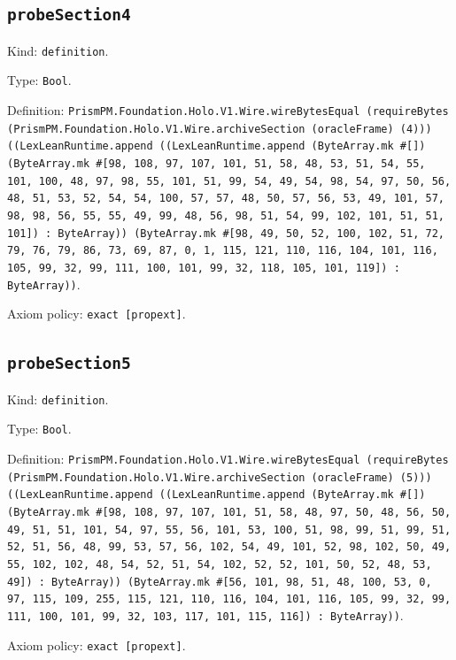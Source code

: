 \documentclass[11pt]{article}
\begin{document}
\subsection*{\texttt{probeSection4}}
\noindent Kind: \texttt{definition}.\par
\noindent Type: \texttt{Bool}.\par
\noindent Definition: \texttt{PrismPM.Foundation.Holo.V1.Wire.wireBytesEqual (requireBytes (PrismPM.Foundation.Holo.V1.Wire.archiveSection (oracleFrame) (4))) ((LexLeanRuntime.append ((LexLeanRuntime.append (ByteArray.mk \#[]) (ByteArray.mk \#[98, 108, 97, 107, 101, 51, 58, 48, 53, 51, 54, 55, 101, 100, 48, 97, 98, 55, 101, 51, 99, 54, 49, 54, 98, 54, 97, 50, 56, 48, 51, 53, 52, 54, 54, 100, 57, 57, 48, 50, 57, 56, 53, 49, 101, 57, 98, 98, 56, 55, 55, 49, 99, 48, 56, 98, 51, 54, 99, 102, 101, 51, 51, 101]) : ByteArray)) (ByteArray.mk \#[98, 49, 50, 52, 100, 102, 51, 72, 79, 76, 79, 86, 73, 69, 87, 0, 1, 115, 121, 110, 116, 104, 101, 116, 105, 99, 32, 99, 111, 100, 101, 99, 32, 118, 105, 101, 119]) : ByteArray))}.\par
\noindent Axiom policy: \texttt{exact [propext]}.\par
\subsection*{\texttt{probeSection5}}
\noindent Kind: \texttt{definition}.\par
\noindent Type: \texttt{Bool}.\par
\noindent Definition: \texttt{PrismPM.Foundation.Holo.V1.Wire.wireBytesEqual (requireBytes (PrismPM.Foundation.Holo.V1.Wire.archiveSection (oracleFrame) (5))) ((LexLeanRuntime.append ((LexLeanRuntime.append (ByteArray.mk \#[]) (ByteArray.mk \#[98, 108, 97, 107, 101, 51, 58, 48, 97, 50, 48, 56, 50, 49, 51, 51, 101, 54, 97, 55, 56, 101, 53, 100, 51, 98, 99, 51, 99, 51, 52, 51, 56, 48, 99, 53, 57, 56, 102, 54, 49, 101, 52, 98, 102, 50, 49, 55, 102, 102, 48, 54, 52, 51, 54, 102, 52, 52, 101, 50, 52, 48, 53, 49]) : ByteArray)) (ByteArray.mk \#[56, 101, 98, 51, 48, 100, 53, 0, 97, 115, 109, 255, 115, 121, 110, 116, 104, 101, 116, 105, 99, 32, 99, 111, 100, 101, 99, 32, 103, 117, 101, 115, 116]) : ByteArray))}.\par
\noindent Axiom policy: \texttt{exact [propext]}.\par
\end{document}
